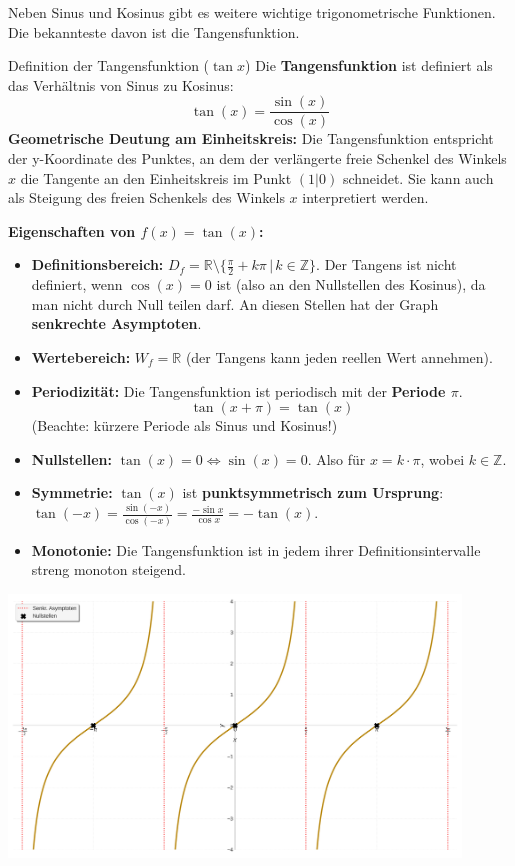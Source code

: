 Neben Sinus und Kosinus gibt es weitere wichtige trigonometrische Funktionen. Die bekannteste davon ist die Tangensfunktion.

\begin{merksatzumgebung}{Definition der Tangensfunktion ($\tan x$)}
Die \textbf{Tangensfunktion} ist definiert als das Verhältnis von Sinus zu Kosinus:
\[ \tan(x) = \frac{\sin(x)}{\cos(x)} \]
\textbf{Geometrische Deutung am Einheitskreis:}
Die Tangensfunktion entspricht der y-Koordinate des Punktes, an dem der verlängerte freie Schenkel des Winkels $x$ die Tangente an den Einheitskreis im Punkt $(1|0)$ schneidet. Sie kann auch als Steigung des freien Schenkels des Winkels $x$ interpretiert werden.

\textbf{Eigenschaften von $f(x)=\tan(x)$:}
\begin{itemize}
    \item \textbf{Definitionsbereich:} $D_f = \mathbb{R} \setminus \{ \frac{\pi}{2} + k\pi \,|\, k \in \mathbb{Z} \}$.
    Der Tangens ist nicht definiert, wenn $\cos(x)=0$ ist (also an den Nullstellen des Kosinus), da man nicht durch Null teilen darf. An diesen Stellen hat der Graph \textbf{senkrechte Asymptoten}.
    \item \textbf{Wertebereich:} $W_f = \mathbb{R}$ (der Tangens kann jeden reellen Wert annehmen).
    \item \textbf{Periodizität:} Die Tangensfunktion ist periodisch mit der \textbf{Periode $\pi$}.
        \[ \tan(x + \pi) = \tan(x) \]
        (Beachte: kürzere Periode als Sinus und Kosinus!)
    \item \textbf{Nullstellen:} $\tan(x) = 0 \Leftrightarrow \sin(x)=0$. Also für $x = k \cdot \pi$, wobei $k \in \mathbb{Z}$.
    \item \textbf{Symmetrie:} $\tan(x)$ ist \textbf{punktsymmetrisch zum Ursprung}: $\tan(-x) = \frac{\sin(-x)}{\cos(-x)} = \frac{-\sin x}{\cos x} = -\tan(x)$.
    \item \textbf{Monotonie:} Die Tangensfunktion ist in jedem ihrer Definitionsintervalle streng monoton steigend.
\end{itemize}
\end{merksatzumgebung}

\begin{center}
    \includegraphics[width=0.9\textwidth]{grafiken/Trig_Tangens_Graph.png}
    \label{fig:tangens_graph}
\end{center}

